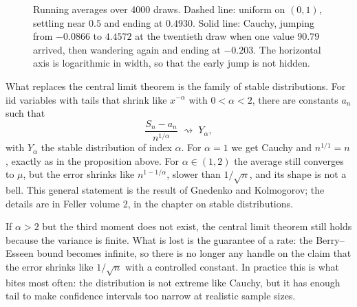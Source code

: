 \begin{figure}[htbp]
\caption{Running averages over 4000 draws. Dashed line: uniform on $(0,1)$, settling
near $0.5$ and ending at $0.4930$. Solid line: Cauchy, jumping from $-0.0866$
to $4.4572$ at the twentieth draw when one value $90.79$ arrived, then wandering
again and ending at $-0.203$. The horizontal axis is logarithmic in width, so that
the early jump is not hidden.}
\label{fig:cauchy-berjalan}
\end{figure}

What replaces the central limit theorem is the family of stable
distributions. For iid variables with tails that shrink
like $x^{-\alpha}$ with $0<\alpha<2$, there are constants $a_n$ such that
\[
\frac{S_n-a_n}{n^{1/\alpha}}\;\rightsquigarrow\;Y_\alpha,
\]
with $Y_\alpha$ the stable distribution of index $\alpha$. For $\alpha=1$ we get
Cauchy and $n^{1/1}=n$, exactly as in the proposition above. For
$\alpha\in(1,2)$ the average still converges to $\mu$, but the error shrinks like
$n^{1-1/\alpha}$, slower than $1/\sqrt n$, and its shape is not a bell. This general
statement is the result of Gnedenko and Kolmogorov; the details are in Feller volume
2, in the chapter on stable distributions.

If $\alpha>2$ but the third moment does not exist, the central limit theorem still
holds because the variance is finite. What is lost is the guarantee of a rate: the
Berry--Esseen bound becomes infinite, so there is no longer any handle on the claim
that the error shrinks like $1/\sqrt n$ with a controlled constant. In practice this
is what bites most often: the distribution is not extreme like Cauchy, but it has
enough tail to make confidence intervals too narrow at realistic sample sizes.

